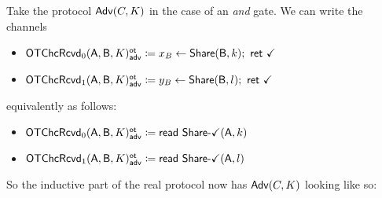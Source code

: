 \noindent Take the protocol $\mathsf{Adv}(C,K)$ in the case of an \emph{and} gate. We can write the channels
\begin{itemize}
\item {\color{blue} $\mathsf{OTChcRcvd}_0(\mathsf{A},\mathsf{B},K)^{\mathsf{ot}}_{\mathsf{adv}} \coloneqq x_B \leftarrow \mathsf{Share}(\mathsf{B},k); \ \mathsf{ret} \ \checkmark$}
\item {\color{blue} $\mathsf{OTChcRcvd}_1(\mathsf{A},\mathsf{B},K)^{\mathsf{ot}}_{\mathsf{adv}} \coloneqq y_B \leftarrow \mathsf{Share}(\mathsf{B},l); \ \mathsf{ret} \ \checkmark$}
\end{itemize}
equivalently as follows:
\begin{itemize}
\item {\color{blue} $\mathsf{OTChcRcvd}_0(\mathsf{A},\mathsf{B},K)^{\mathsf{ot}}_{\mathsf{adv}} \coloneqq \mathsf{read} \ \mathsf{Share}\textsf{-}\checkmark(\mathsf{A},k)$}
\item {\color{blue} $\mathsf{OTChcRcvd}_1(\mathsf{A},\mathsf{B},K)^{\mathsf{ot}}_{\mathsf{adv}} \coloneqq \mathsf{read} \ \mathsf{Share}\textsf{-}\checkmark(\mathsf{A},l)$}
\end{itemize}
So the inductive part of the real protocol now has $\mathsf{Adv}(C,K)$ looking like so:

